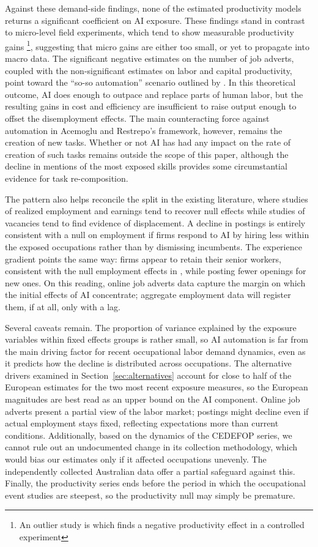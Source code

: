 \documentclass[11pt]{article}
\begin{document}
Against these demand-side findings, none of the estimated productivity models returns a significant coefficient on AI exposure. These findings stand in contrast to micro-level field experiments, which tend to show measurable productivity gains \citep{brynjolfsson2025genai}\footnote{An outlier study is \citet{becker2025measuring} which finds a negative productivity effect in a controlled experiment}, suggesting that micro gains are either too small, or yet to propagate into macro data. The significant negative estimates on the number of job adverts, coupled with the non-significant estimates on labor and capital productivity, point toward the ``so-so automation'' scenario outlined by \citet{acemoglu_automation_2019}. In this theoretical outcome, AI does enough to outpace and replace parts of human labor, but the resulting gains in cost and efficiency are insufficient to raise output enough to offset the disemployment effects. The main counteracting force against automation in Acemoglu and Restrepo's framework, however, remains the creation of new tasks. Whether or not AI has had any impact on the rate of creation of such tasks remains outside the scope of this paper, although the decline in mentions of the most exposed skills provides some circumstantial evidence for task re-composition.

The pattern also helps reconcile the split in the existing literature, where studies of realized employment and earnings tend to recover null effects while studies of vacancies tend to find evidence of displacement. A decline in postings is entirely consistent with a null on employment if firms respond to AI by hiring less within the exposed occupations rather than by dismissing incumbents. The experience gradient points the same way: firms appear to retain their senior workers, consistent with the null employment effects in \citet{brynjolfsson2025canaries}, while posting fewer openings for new ones. On this reading, online job adverts data capture the margin on which the initial effects of AI concentrate; aggregate employment data will register them, if at all, only with a lag.

Several caveats remain. The proportion of variance explained by the exposure variables within fixed effects groups is rather small, so AI automation is far from the main driving factor for recent occupational labor demand dynamics, even as it predicts how the decline is distributed across occupations. The alternative drivers examined in Section~\ref{sec:alternatives} account for close to half of the European estimates for the two most recent exposure measures, so the European magnitudes are best read as an upper bound on the AI component. Online job adverts present a partial view of the labor market; postings might decline even if actual employment stays fixed, reflecting expectations more than current conditions. Additionally, based on the dynamics of the CEDEFOP series, we cannot rule out an undocumented change in its collection methodology, which would bias our estimates only if it affected occupations unevenly. The independently collected Australian data offer a partial safeguard against this. Finally, the productivity series ends before the period in which the occupational event studies are steepest, so the productivity null may simply be premature.
\end{document}
